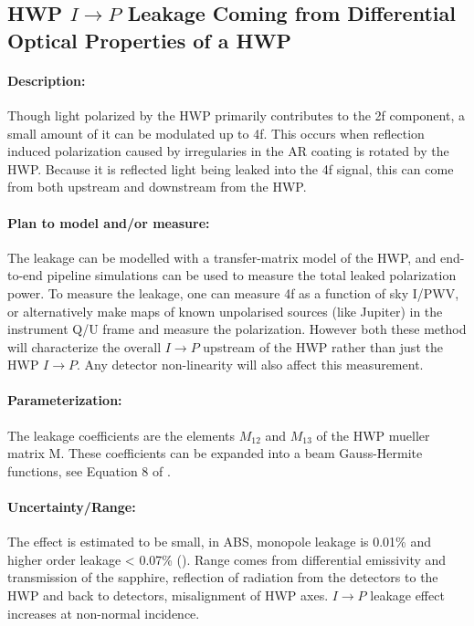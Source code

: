 \subsection{HWP $I \rightarrow P$ Leakage Coming from Differential Optical Properties of a HWP}

\paragraph{Description:}
Though light polarized by the HWP primarily contributes to the 2f component, a small amount of it can be modulated 
up to 4f.
This occurs when reflection induced polarization caused by irregularies in the AR coating is rotated by the HWP\cite{Essinger-Hileman2013, Essinger-Hileman2016, ABS_HWP}. 
Because it is reflected light being leaked into the 4f signal, this can come from both upstream and downstream from the HWP.

\paragraph{Plan to model and/or measure:}
The leakage can be modelled with a transfer-matrix model of the HWP, and end-to-end pipeline simulations can be used to measure the total leaked polarization power.
To measure the leakage, one can measure 4f as a function of sky I/PWV, or alternatively make maps of known unpolarised sources (like Jupiter) in the instrument Q/U frame
and measure the polarization. However both these method will characterize the overall $I \rightarrow P$ upstream of the HWP rather than just the HWP $I \rightarrow P$.
Any detector non-linearity will also affect this measurement.


\paragraph{Parameterization:}
The leakage coefficients are the elements $M_{12}$ and $M_{13}$ of the HWP mueller matrix M. These coefficients can be expanded into a beam Gauss-Hermite functions, 
see Equation 8 of \cite{Essinger-Hileman2016}. 

\paragraph{Uncertainty/Range:}
The effect is estimated to be small, in ABS, monopole leakage is 0.01\% and higher order leakage < 0.07\% (\cite{Essinger-Hileman2016}).
Range comes from differential emissivity and transmission of the sapphire, reflection of radiation from the detectors to the HWP and back to detectors, 
misalignment of HWP axes. $I \rightarrow P$ leakage effect increases at non-normal incidence.
